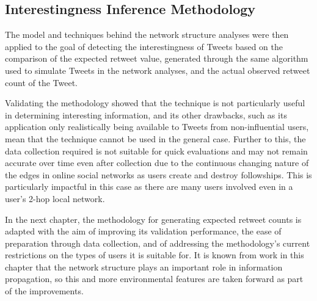 \subsection{Interestingness Inference Methodology}
The model and techniques behind the network structure analyses were then applied to the goal of detecting the interestingness of Tweets based on the comparison of the expected retweet value, generated through the same algorithm used to simulate Tweets in the network analyses, and the actual observed retweet count of the Tweet.

Validating the methodology showed that the technique is not particularly useful in determining interesting information, and its other drawbacks, such as its application only realistically being available to Tweets from non-influential users, mean that the technique cannot be used in the general case. Further to this, the data collection required is not suitable for quick evaluations and may not remain accurate over time even after collection due to the continuous changing nature of the edges in online social networks as users create and destroy followships. This is particularly impactful in this case as there are many users involved even in a user's 2-hop local network.

In the next chapter, the methodology for generating expected retweet counts is adapted with the aim of improving its validation performance, the ease of preparation through data collection, and of addressing the methodology's current restrictions on the types of users it is suitable for. It is known from work in this chapter that the network structure plays an important role in information propagation, so this and more environmental features are taken forward as part of the improvements. 
